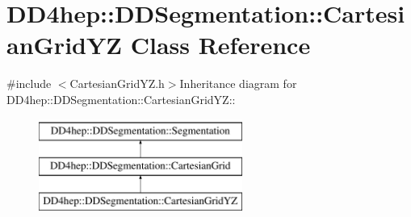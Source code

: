 \hypertarget{class_d_d4hep_1_1_d_d_segmentation_1_1_cartesian_grid_y_z}{
\section{DD4hep::DDSegmentation::CartesianGridYZ Class Reference}
\label{class_d_d4hep_1_1_d_d_segmentation_1_1_cartesian_grid_y_z}
}


{\ttfamily \#include $<$CartesianGridYZ.h$>$}Inheritance diagram for DD4hep::DDSegmentation::CartesianGridYZ::\begin{figure}[H]
\begin{center}
\leavevmode
\includegraphics[height=3cm]{class_d_d4hep_1_1_d_d_segmentation_1_1_cartesian_grid_y_z}
\end{center}
\end{figure}
